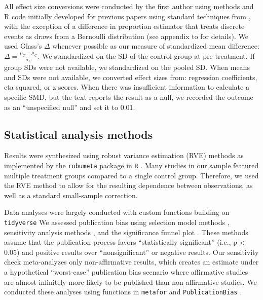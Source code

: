 \documentclass[sn-nature,referee,pdflatex]{sn-jnl}
\begin{document}
All effect size conversions were conducted by the first author using
methods and R code initially developed for previous papers
\citep{paluck2019, paluck2021, porat2024} using standard techniques from
\citep{cooper2019}, with the exception of a difference in proportion
estimator that treats discrete events as draws from a Bernoulli
distribution (see appendix to \citep{paluck2021} for details). We used
Glass's \(\Delta\) whenever possible as our measure of standardized mean
difference: \(\Delta = \frac{\mu_T - \mu_C}{\sigma_C}\). We standardized
on the SD of the control group at pre-treatment. If group SDs were not
available, we standardized on the pooled SD. When means and SDs were not
available, we converted effect sizes from: regression coefficients, eta
squared, or z scores. When there was insufficient information to
calculate a specific SMD, but the text reports the result as a null, we
recorded the outcome as an ``unspecified null'' and set it to 0.01.

\subsection{Statistical analysis methods}\label{sec3.4}

Results were synthesized using robust variance estimation (RVE) methods
\citep{hedges2010} as implemented by the \texttt{robumeta} package
\citep{fisher2015} in \texttt{R} \citep{Rlang}. Many studies in our
sample featured multiple treatment groups compared to a single control
group. Therefore, we used the RVE method to allow for the resulting
dependence between observations, as well as a standard small-sample
correction.

Data analyses were largely conducted with custom functions building on
\texttt{tidyverse} \citep{wickham2019} We assessed publication bias
using selection model methods \citep{hedges1992, vevea1995}, sensitivity
analysis methods \citep{mathur2024}, and the significance funnel plot
\citep{mathur2020}. These methods assume that the publication process
favors ``statistically significant'' (i.e., p \textless{} 0.05) and
positive results over ``nonsignificant'' or negative results. Our
sensitivity check meta-analyzes only non-affirmative results, which
creates an estimate under a hypothetical ``worst-case'' publication bias
scenario where affirmative studies are almost infinitely more likely to
be published than non-affirmative studies. We conducted these analyses
using functions in \texttt{metafor} \citep{viechtbauer2010} and
\texttt{PublicationBias} \citep{mathur2020, mathur2024}.
\end{document}
